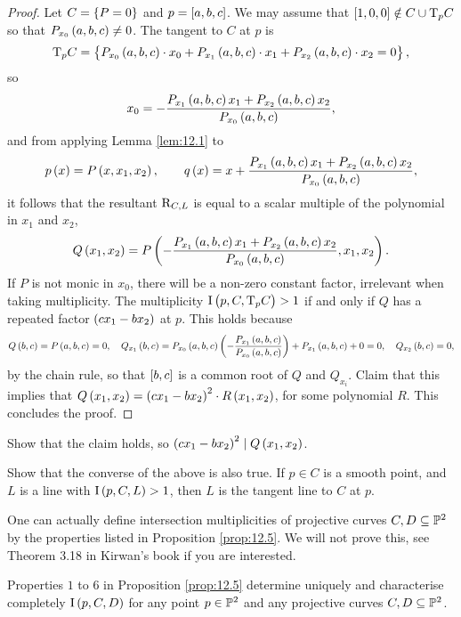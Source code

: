 \begin{proof}
Let $ C = \cbr{P = 0} $ and $ p = \sbr{a, b, c} $. We may assume that $ \sbr{1, 0, 0} \notin C \cup \T_p C $ so that $ P_{x_0}\br{a, b, c} \ne 0 $. The tangent to $ C $ at $ p $ is
$$ \T_p C = \cbr{P_{x_0}\br{a, b, c} \cdot x_0 + P_{x_1}\br{a, b, c} \cdot x_1 + P_{x_2}\br{a, b, c} \cdot x_2 = 0}, $$
so
$$ x_0 = -\dfrac{P_{x_1}\br{a, b, c}x_1 + P_{x_2}\br{a, b, c}x_2}{P_{x_0}\br{a, b, c}}, $$
and from applying Lemma \ref{lem:12.1} to
$$ p\br{x} = P\br{x, x_1, x_2}, \qquad q\br{x} = x + \dfrac{P_{x_1}\br{a, b, c}x_1 + P_{x_2}\br{a, b, c}x_2}{P_{x_0}\br{a, b, c}}, $$
it follows that the resultant $ \mathrm{R}_{C, L} $ is equal to a scalar multiple of the polynomial in $ x_1 $ and $ x_2 $,
$$ Q\br{x_1, x_2} = P\br{-\dfrac{P_{x_1}\br{a, b, c}x_1 + P_{x_2}\br{a, b, c}x_2}{P_{x_0}\br{a, b, c}}, x_1, x_2}. $$
If $ P $ is not monic in $ x_0 $, there will be a non-zero constant factor, irrelevant when taking multiplicity. The multiplicity $ \I\br{p, C, \T_p C} > 1 $ if and only if $ Q $ has a repeated factor $ \br{cx_1 - bx_2} $ at $ p $. This holds because
$$ Q\br{b, c} = P\br{a, b, c} = 0, \quad Q_{x_1}\br{b, c} = P_{x_0}\br{a, b, c}\br{-\dfrac{P_{x_1}\br{a, b, c}}{P_{x_0}\br{a, b, c}}} + P_{x_1}\br{a, b, c} + 0 = 0, \quad Q_{x_2}\br{b, c} = 0, $$
by the chain rule, so that $ \sbr{b, c} $ is a common root of $ Q $ and $ Q_{x_i} $. Claim that this implies that $ Q\br{x_1, x_2} = \br{cx_1 - bx_2}^2 \cdot R\br{x_1, x_2} $, for some polynomial $ R $. This concludes the proof.
\end{proof}

\begin{exercise**}
Show that the claim holds, so $ \br{cx_1 - bx_2}^2 \mid Q\br{x_1, x_2} $.
\end{exercise**}

\begin{exercise**}
Show that the converse of the above is also true. If $ p \in C $ is a smooth point, and $ L $ is a line with $ \I\br{p, C, L} > 1 $, then $ L $ is the tangent line to $ C $ at $ p $.
\end{exercise**}

\pagebreak

One can actually define intersection multiplicities of projective curves $ C, D \subseteq \mathbb{P}^2 $ by the properties listed in Proposition \ref{prop:12.5}. We will not prove this, see Theorem 3.18 in Kirwan's book if you are interested.

\begin{proposition}
\label{prop:12.8}
Properties $ 1 $ to $ 6 $ in Proposition \ref{prop:12.5} determine uniquely and characterise completely $ \I\br{p, C, D} $ for any point $ p \in \mathbb{P}^2 $ and any projective curves $ C, D \subseteq \mathbb{P}^2 $.
\end{proposition}

